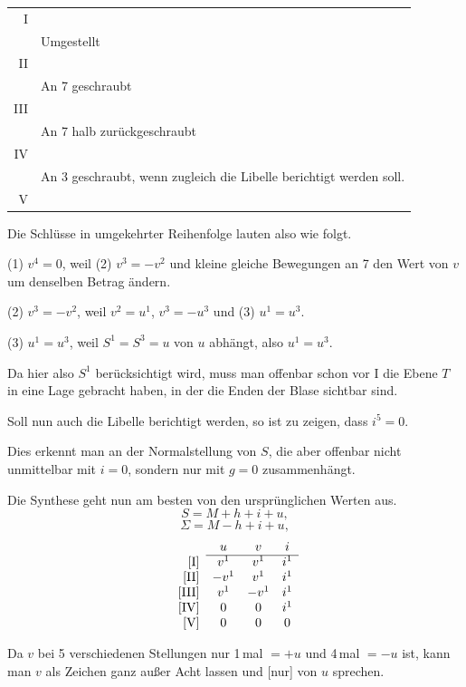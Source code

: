 \begin{center}
\begin{tabular}{r|p{.82\linewidth}}
I & \\
 & Umgestellt\\
II & \\
 & An 7 geschraubt\\
III & \\
 & An 7 halb zurückgeschraubt\\
IV & \\
 & An 3 geschraubt, wenn zugleich die Libelle berichtigt werden soll.\\
V &
\end{tabular}
\end{center}

Die Schlüsse in umgekehrter Reihenfolge lauten also wie folgt.

(1) $v^4=0$, weil (2) $v^3=-v^2$ und kleine gleiche Bewegungen an 7 den Wert von $v$ um denselben Betrag ändern.

(2) $v^3=-v^2$, weil $v^2=u^1$, $v^3=-u^3$ und (3) $u^1=u^3$.

(3) $u^1=u^3$, weil $S^1=S^3=u$ von $u$ abhängt, also $u^1=u^3$.

Da hier also $S^1$ berücksichtigt wird, muss man offenbar schon vor I die Ebene $T$ in eine Lage gebracht haben, in der die Enden der Blase sichtbar sind.

Soll nun auch die Libelle berichtigt werden, so ist zu zeigen, dass $i^5=0$.

Dies erkennt man an der Normalstellung von $S$, die aber offenbar nicht unmittelbar mit $i=0$, sondern nur mit $g=0$ zusammenhängt.

Die Synthese geht nun am besten von den ursprünglichen Werten aus.
\[
S = M+h+i+u,
\]
\[
\Sigma = M-h+i+u,
\]
\[
\begin{array}{rccc}
 & u & v & i \\
\cline{2-4}
{[\mathrm{I}]} & v^1 & v^1 & i^1 \\
{[\mathrm{II}]} & -v^1 & v^1 & i^1 \\
{[\mathrm{III}]} & v^1 & -v^1 & i^1 \\
{[\mathrm{IV}]} & 0 & 0 & i^1 \\
{[\mathrm{V}]} & 0 & 0 & 0 \\
\end{array}
\]

Da $v$ bei 5 verschiedenen Stellungen nur 1\,mal $=+u$ und 4\,mal $=-u$ ist, kann man $v$ als Zeichen ganz außer Acht lassen und [nur] von $u$ sprechen.

